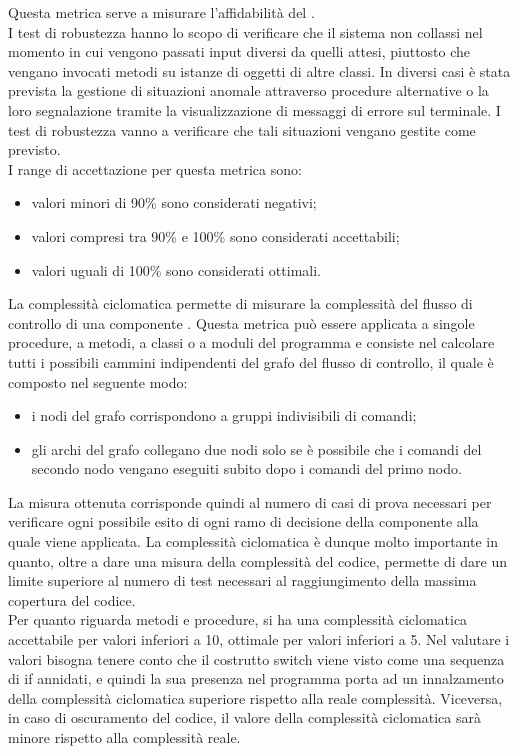 				 \label{subsec:percTestRobustezza}
					Questa metrica serve a misurare l'affidabilità del .
					\\I test di robustezza hanno lo scopo di verificare che il sistema non collassi nel momento in cui vengono passati input diversi da quelli attesi, piuttosto che vengano invocati metodi su istanze di oggetti di altre classi. In diversi casi è stata prevista la gestione di situazioni anomale attraverso procedure alternative o la loro segnalazione tramite la visualizzazione di messaggi di errore sul terminale. I test di robustezza vanno a verificare che tali situazioni vengano gestite come previsto.
					\\I range di accettazione per questa metrica sono:
					\begin{itemize}
					\item valori minori di 90\% sono considerati negativi;
					\item valori compresi tra 90\% e 100\% sono considerati accettabili;
					\item valori uguali di 100\% sono considerati ottimali.
					\end{itemize}
			 \label{subsec:complCiclomatica}
				La complessità ciclomatica permette di misurare la complessità del flusso di controllo di una componente . Questa metrica può essere applicata a singole procedure, a metodi, a classi o a moduli del programma e consiste nel calcolare tutti i possibili cammini indipendenti del grafo del flusso di controllo, il quale è composto nel seguente modo:
				\begin{itemize}
					\item i nodi del grafo corrispondono a gruppi indivisibili di comandi;
					\item gli archi del grafo collegano due nodi solo se è possibile che i comandi del secondo nodo vengano eseguiti subito dopo i comandi del primo nodo.
				\end{itemize}
				La misura ottenuta corrisponde quindi al numero di casi di prova necessari per verificare ogni possibile esito di ogni ramo di decisione della componente alla quale viene applicata. La complessità ciclomatica è dunque molto importante in quanto, oltre a dare una misura della complessità del codice, permette di dare un limite superiore al numero di test necessari al raggiungimento della massima copertura del codice.\\
				Per quanto riguarda metodi e procedure, si ha una complessità ciclomatica accettabile per valori inferiori a 10, ottimale per valori inferiori a 5. Nel valutare i valori bisogna tenere conto che il costrutto switch viene visto come una sequenza di if annidati, e quindi la sua presenza nel programma porta ad un innalzamento della complessità ciclomatica superiore rispetto alla reale complessità. Viceversa, in caso di oscuramento del codice, il valore della complessità ciclomatica sarà minore rispetto alla complessità reale.
